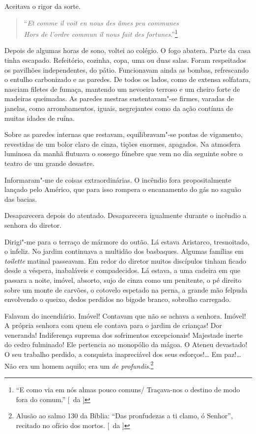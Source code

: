Aceitava o rigor da sorte. 

\begin{verse}
\hspace{-2em}``\textit{Et comme il voit en nous des âmes peu communes}\\
\hspace{-2em}\textit{Hors de l'ordre commun il nous fait des fortunes}.''\footnote{ ``E como 
via em nós almas pouco comuns/ Traçava-nos o destino de modo fora do comum.'' [~da ]}
\end{verse}

\noindent\dotfill

Depois de algumas horas de sono, voltei ao colégio. O fogo abatera. Parte da casa
tinha escapado. Refeitório, cozinha, copa, uma ou duas salas. Foram
respeitados os pavilhões independentes, do pátio. Funcionavam ainda as
bombas, refrescando o entulho carbonizado e as paredes. De todos os
lados, como de extensa solfatara, nasciam filetes de fumaça, mantendo
um nevoeiro terroso e um cheiro forte de madeiras queimadas. As paredes
mestras sustentavam"-se firmes, varadas de janelas, como
arrombamentos, iguais, negrejantes como da ação contínua de muitas
idades de ruína. 


Sobre as paredes internas que restavam,
equilibravam"-se pontas de vigamento, revestidas de um bolor claro de
cinza, tições enormes, apagados. Na atmosfera luminosa da manhã
flutuava o sossego fúnebre que vem no dia seguinte sobre o teatro de um
grande desastre. 

Informaram"-me de coisas extraordinárias. O incêndio
fora propositalmente lançado pelo Américo, que para isso rompera o
encanamento do gás no saguão das bacias. 

Desaparecera depois do
atentado. Desaparecera igualmente durante o incêndio a senhora do
diretor. 

Dirigi"-me para o terraço de mármore do outão. Lá estava
Aristarco, tresnoitado, o infeliz. No jardim continuava a multidão dos
basbaques. Algumas famílias em \textit{toilette} matinal passeavam. Em redor do
diretor muitos discípulos tinham ficado desde a véspera, inabaláveis e
compadecidos. Lá estava, a uma cadeira em que passara a noite, imóvel,
absorto, sujo de cinza como um penitente, o pé direito sobre um monte
de carvões, o cotovelo espetado na perna, a grande mão felpuda
envolvendo o queixo, dedos perdidos no bigode branco, sobrolho
carregado. 

Falavam do incendiário. Imóvel! Contavam que não se achava a
senhora. Imóvel! A própria senhora com quem ele contava para o jardim
de crianças! Dor veneranda! Indiferença suprema dos sofrimentos
excepcionais! Majestade inerte do cedro fulminado! Ele pertencia ao
monopólio da mágoa. O Ateneu devastado! O seu trabalho perdido, a
conquista inapreciável dos seus esforços!\ldots{} Em paz!\ldots{} Não era um
homem aquilo; era um \textit{de profundis}.\footnote{ Alusão ao salmo 130 da Bíblia:
``Das pronfudezas a ti clamo, ó Senhor'', recitado no ofício dos mortos. [~da ]} 

